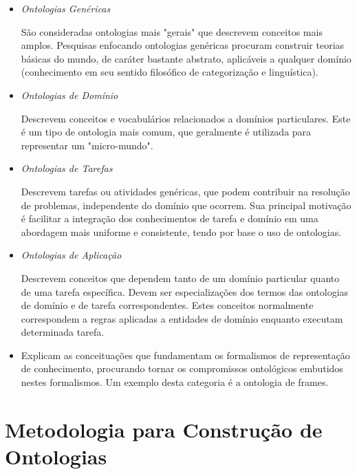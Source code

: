 \begin{itemize}
    \item \textit{Ontologias Genéricas}
    
    São consideradas ontologias mais "gerais" que descrevem conceitos mais 
    amplos. Pesquisas enfocando ontologias genéricas procuram construir teorias
    básicas do mundo, de caráter bastante abstrato, aplicáveis a qualquer domínio
    (conhecimento em seu sentido filosófico de categorização e linguística).
    
    \item \textit{Ontologias de Domínio}
    
    Descrevem conceitos e vocabulários relacionados a domínios particulares. Este
    é um tipo de ontologia mais comum, que geralmente é utilizada para representar
    um "micro-mundo".
    
    \item \textit{Ontologias de Tarefas}
    
    Descrevem tarefas ou atividades genéricas, que podem contribuir na resolução
    de problemas, independente do domínio que ocorrem. Sua principal motivação 
    é facilitar a integração dos conhecimentos de tarefa e domínio em uma 
    abordagem mais uniforme e consistente, tendo por base o uso de ontologias.
    
    \item \textit{Ontologias de Aplicação}
    
    Descrevem conceitos que dependem tanto de um domínio particular quanto de uma
    tarefa específica. Devem ser especializações dos termos das ontologias de 
    domínio e de tarefa correspondentes. Estes conceitos normalmente correspondem
    a regras aplicadas a entidades de domínio enquanto executam determinada tarefa.
    
    \item {}
    
    Explicam as conceituações que fundamentam os formalismos de representação de 
    conhecimento, procurando tornar os compromissos ontológicos embutidos nestes
    formalismos. Um exemplo desta categoria é a ontologia de frames.

\end{itemize}

\section{Metodologia para Construção de Ontologias}
\label{sec:metodologias_para_construcao_de_ontologias}

